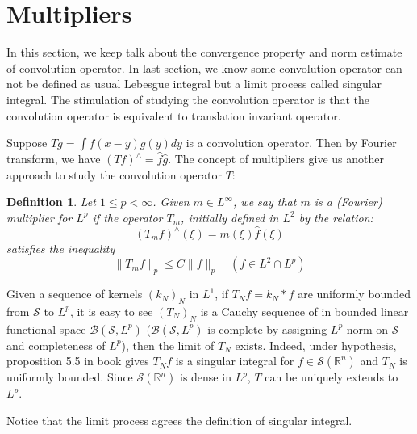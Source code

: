 \documentclass{report}
\theoremstyle{definition}
\theoremstyle{definition}
\theoremstyle{plain}
\newtheorem{definition}[theorem]{Definition}
\numberwithin{theorem}{subsection}
\numberwithin{remark}{subsection}
\newcommand{\norm}[1]{\lVert#1\rVert}
\begin{document}
\section{Multipliers}
In this section, we keep talk about the convergence property and norm estimate of convolution operator. In last section, we know
some convolution operator can not be defined as usual Lebesgue integral but a limit process called singular integral. The stimulation of
studying the convolution operator is that the convolution operator is equivalent to translation invariant operator.\par
Suppose $Tg=\int f(x-y)g(y)dy$ is a convolution operator. Then by Fourier transform, we have $(Tf)^\wedge=\hat{f}\hat{g}$. The  concept of multipliers give us another approach to study the convolution operator $T$:
\begin{definition}
    Let $1\leq p<\infty$. Given $m\in L^\infty$, we say that $m$ is a (Fourier) multiplier for $L^p$ if the operator
    $T_m$, initially defined in $L^2$ by the relation:
    \begin{equation*}
        (T_mf)^\wedge(\xi)=m(\xi)\hat{f}(\xi)
    \end{equation*}
    satisfies the inequality
    \begin{equation*}
        \norm{T_mf}_p\leq C\norm{f}_p  \quad (f\in L^2\cap L^p)
    \end{equation*}
\end{definition}

\begin{remark}
    {\color{blue} Given a sequence of kernels $(k_N)_N$ in $L^1$, if $T_Nf=k_N*f$ are uniformly bounded from $\mathscr{S}$ to $L^p$,
        it is easy to see $(T_N)_N$ is a Cauchy sequence of in bounded linear functional space $\mathscr{B}(\mathscr{S},L^p)$ ($\mathscr{B}(\mathscr{S},L^p)$ is complete by
        assigning $L^p$ norm on $\mathscr{S}$ and completeness of $L^p$), then the limit of $T_N$ exists.
        Indeed, under hypothesis, proposition 5.5 in book gives $T_Nf$ is a singular integral for $f\in \mathscr{S}(\mathbb{R}^n)$ and $T_N$ is uniformly bounded.
        Since $\mathscr{S}(\mathbb{R}^n)$ is dense in $L^p$, $T$ can be uniquely extends to $L^p$}.\par
    Notice that the limit process agrees the definition of singular integral.
\end{remark}
\end{document}
